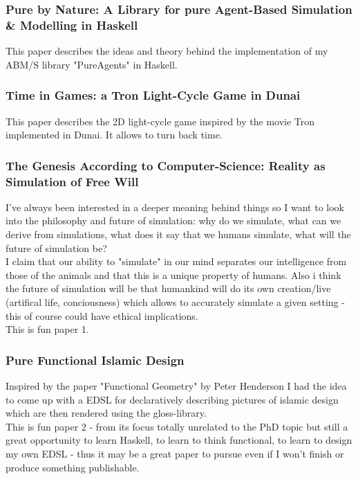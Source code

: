 \subsubsection{Pure by Nature: A Library for pure Agent-Based Simulation \& Modelling in Haskell}
This paper describes the ideas and theory behind the implementation of my ABM/S library "PureAgents" in Haskell.

\subsubsection{Time in Games: a Tron Light-Cycle Game in Dunai}
This paper describes the 2D light-cycle game inspired by the movie Tron implemented in Dunai. It allows to turn back time.

\subsubsection{The Genesis According to Computer-Science: Reality as Simulation of Free Will}
I've always been interested in a deeper meaning behind things so I want to look into the philosophy and future of simulation: why do we simulate, what can we derive from simulations, what does it say that we humans simulate, what will the future of simulation be? \\
I claim that our ability to "simulate" in our mind separates our intelligence from those of the animals and that this is a unique property of humans. Also i think the future of simulation will be that humankind will do its own creation/live (artifical life, conciousness) which allows to accurately simulate a given setting - this of course could have ethical implications. \\
This is fun paper 1.

\subsubsection{Pure Functional Islamic Design}
Inspired by the paper "Functional Geometry" by Peter Henderson I had the idea to come up with a  EDSL for declaratively describing pictures of islamic design which are then rendered using the gloss-library. \\
This is fun paper 2 - from its focus totally unrelated to the PhD topic but still a great opportunity to learn Haskell, to learn to think functional, to learn to design my own EDSL - thus it may be a great paper to pursue even if I won't finish or produce something publishable.

